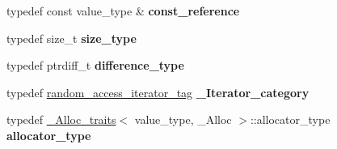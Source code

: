 \begin{DoxyCompactItemize}
typedef const value\+\_\+type \& {\bfseries const\+\_\+reference}
\item 
\mbox{\label{structvector_aa170ed4a6f97588a3c307163121f9abe}} 
typedef size\+\_\+t {\bfseries size\+\_\+type}
\item 
\mbox{\label{structvector_ab3abe0327ec599faa74375090b9a16a9}} 
typedef ptrdiff\+\_\+t {\bfseries difference\+\_\+type}
\item 
\mbox{\label{structvector_a2e773217fc82a90ea2f6d49b64aa5818}} 
typedef \hyperlink{structrandom__access__iterator__tag}{random\+\_\+access\+\_\+iterator\+\_\+tag} {\bfseries \+\_\+\+Iterator\+\_\+category}
\item 
\mbox{\label{structvector_a6f6d86b4ab83abff7e2e241202ca608d}} 
typedef \hyperlink{struct___alloc__traits}{\+\_\+\+Alloc\+\_\+traits}$<$ value\+\_\+type, \+\_\+\+Alloc $>$\+::allocator\+\_\+type {\bfseries allocator\+\_\+type}
\end{DoxyCompactItemize}
